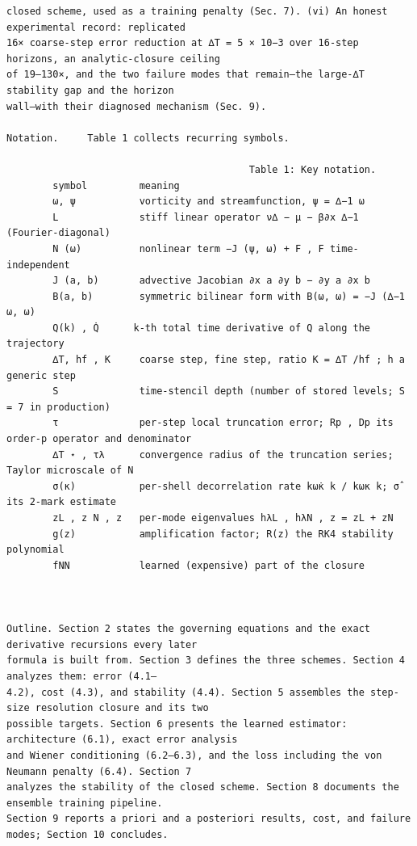 \documentclass[letterpaper]{article}
\begin{document}
\begin{Verbatim}[fontsize=\fontsize{6.35}{7.15}\selectfont,breaklines=false]
closed scheme, used as a training penalty (Sec. 7). (vi) An honest experimental record: replicated
16× coarse-step error reduction at ∆T = 5 × 10−3 over 16-step horizons, an analytic-closure ceiling
of 19–130×, and the two failure modes that remain—the large-∆T stability gap and the horizon
wall—with their diagnosed mechanism (Sec. 9).

Notation.     Table 1 collects recurring symbols.

                                          Table 1: Key notation.
        symbol         meaning
        ω, ψ           vorticity and streamfunction, ψ = ∆−1 ω
        L              stiff linear operator ν∆ − μ − β∂x ∆−1 (Fourier-diagonal)
        N (ω)          nonlinear term −J (ψ, ω) + F , F time-independent
        J (a, b)       advective Jacobian ∂x a ∂y b − ∂y a ∂x b
        B(a, b)        symmetric bilinear form with B(ω, ω) = −J (∆−1 ω, ω)
        Q(k) , Q̇      k-th total time derivative of Q along the trajectory
        ∆T, hf , K     coarse step, fine step, ratio K = ∆T /hf ; h a generic step
        S              time-stencil depth (number of stored levels; S = 7 in production)
        τ              per-step local truncation error; Rp , Dp its order-p operator and denominator
        ∆T ⋆ , τλ      convergence radius of the truncation series; Taylor microscale of N
        σ(κ)           per-shell decorrelation rate kω̇κ k / kωκ k; σ̂ its 2-mark estimate
        zL , z N , z   per-mode eigenvalues hλL , hλN , z = zL + zN
        g(z)           amplification factor; R(z) the RK4 stability polynomial
        fNN            learned (expensive) part of the closure



Outline. Section 2 states the governing equations and the exact derivative recursions every later
formula is built from. Section 3 defines the three schemes. Section 4 analyzes them: error (4.1–
4.2), cost (4.3), and stability (4.4). Section 5 assembles the step-size resolution closure and its two
possible targets. Section 6 presents the learned estimator: architecture (6.1), exact error analysis
and Wiener conditioning (6.2–6.3), and the loss including the von Neumann penalty (6.4). Section 7
analyzes the stability of the closed scheme. Section 8 documents the ensemble training pipeline.
Section 9 reports a priori and a posteriori results, cost, and failure modes; Section 10 concludes.


\end{Verbatim}
\end{document}
